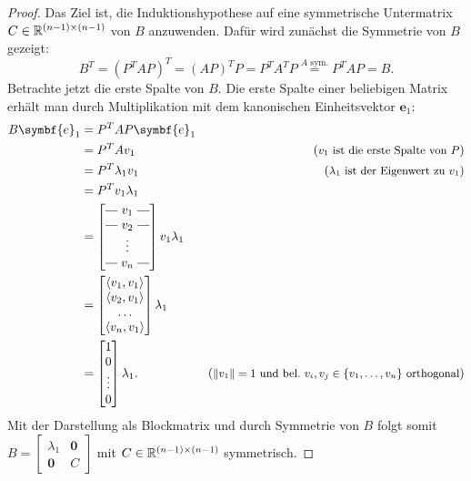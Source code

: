 \begin{proof}
    Das Ziel ist, die Induktionshypothese auf eine symmetrische Untermatrix \(C \in \mathbb{R}^{\left(n-1\right)\times\left(n-1\right)}\) von \(B\) anzuwenden.
    Dafür wird zunächst die Symmetrie von \(B\) gezeigt:   
    \begin{equation*}
        B^{T} = {\left(P^{T}AP\right)}^{T} = {\left(AP\right)}^{T}P = P^{T}A^{T}P \overset{A\text{ sym.}}{=} P^{T}AP = B.
    \end{equation*} 
    Betrachte jetzt die erste Spalte von \(B\). 
    Die erste Spalte einer beliebigen Matrix erhält man durch Multiplikation mit dem kanonischen Einheitsvektor \(\symbf{e}_1\): 
    \begin{align*}
        B\symbf{e}_1 &= P^{T}AP\symbf{e}_1 \\
        &= P^{T}Av_1 & {\left(\text{\small\(v_1\) ist die erste Spalte von \(P\)}\right)} \\
        &= P^{T}{\lambda}_1v_1 & {\left(\text{\small\(\lambda_1\) ist der Eigenwert zu \(v_1\)}\right)} \\
        &= P^{T}v_1{\lambda}_1 \\
        &= \brows{v_1 \\ v_2 \\ \rowsvdots \\ v_n}v_1{\lambda}_1 \\
        &= 
        \begin{bmatrix}
                \langle v_1,v_1 \rangle \\ \langle v_2,v_1 \rangle \\ \dots \\ \langle v_n,v_1 \rangle
        \end{bmatrix}
        {\lambda}_1 \\
        &=
        \begin{bmatrix}
            1  \\ 0 \\ \vdots \\ 0
        \end{bmatrix}
        {\lambda}_1. & {\left(\text{\small\(\norm{v_1} = 1\) und bel.\ \(v_i,v_j \in \{v_1,\ldots,v_n\}\) orthogonal}\right)}
    \end{align*}
    Mit der Darstellung als Blockmatrix und durch Symmetrie von \(B\) folgt somit 
    \(
    B = 
    \begin{bmatrix}
        {\lambda}_1 & \symbf{0} \\
        \symbf{0} & C
    \end{bmatrix}
    \)
    mit \(C \in \mathbb{R}^{(n-1) \times (n-1)}\) symmetrisch.


\end{proof}
